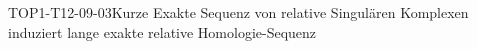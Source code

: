 
\begin{THEO}{TOP1-T12-09-03}{Kurze Exakte Sequenz von relative Singulären Komplexen induziert lange exakte relative Homologie-Sequenz}
\end{THEO}
